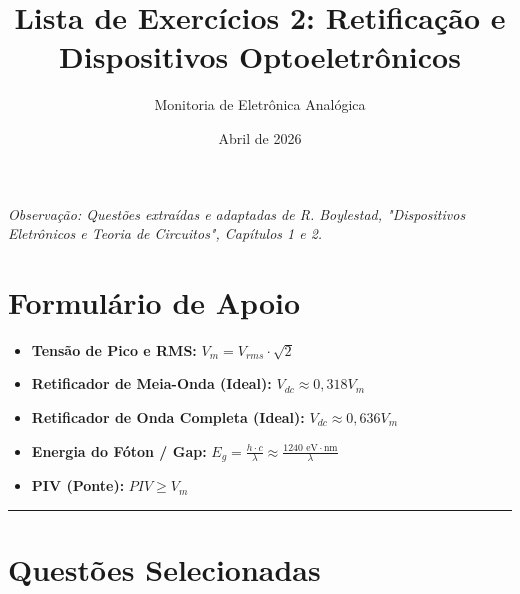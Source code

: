\documentclass[a4paper,12pt]{article}
\title{Lista de Exercícios 2: Retificação e Dispositivos Optoeletrônicos}
\author{Monitoria de Eletrônica Analógica}
\date{Abril de 2026}
\begin{document}
\maketitle

\begin{center}
    \textit{Observação: Questões extraídas e adaptadas de R. Boylestad, "Dispositivos Eletrônicos e Teoria de Circuitos", Capítulos 1 e 2.}
\end{center}

\section*{Formulário de Apoio}

\begin{itemize}
    \item \textbf{Tensão de Pico e RMS:} $V_m = V_{rms} \cdot \sqrt{2}$
    \item \textbf{Retificador de Meia-Onda (Ideal):} $V_{dc} \approx 0,318 V_m$
    \item \textbf{Retificador de Onda Completa (Ideal):} $V_{dc} \approx 0,636 V_m$
    \item \textbf{Energia do Fóton / Gap:} $E_g = \frac{h \cdot c}{\lambda} \approx \frac{1240\text{ eV}\cdot\text{nm}}{\lambda}$
    \item \textbf{PIV (Ponte):} $PIV \geq V_m$
\end{itemize}

\hrule
\section*{Questões Selecionadas}
\end{document}
